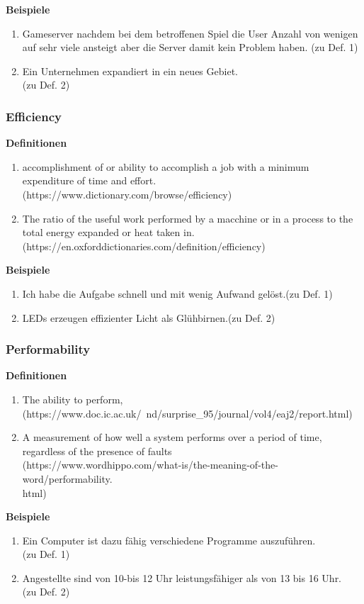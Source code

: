 \documentclass[a4paper, 15pt]{scrartcl}
\begin{document}
					\textbf{Beispiele}
					\begin{enumerate}
						\item Gameserver nachdem bei dem betroffenen Spiel die User Anzahl von wenigen auf sehr viele ansteigt aber die Server damit kein Problem haben. (zu Def. 1)
		
						\item Ein Unternehmen expandiert in ein neues Gebiet. \\(zu Def. 2)
					\end{enumerate}
	
	\newpage
				\subsubsection*{Efficiency}
					\textbf{Definitionen}
					\begin{enumerate}
						\item \grqq accomplishment of or ability to accomplish a job with a minimum expenditure of time and effort.\grqq(https://www.dictionary.com/browse/efficiency)
		
						\item \grqq The ratio of the useful work performed by a macchine or in a process to the total energy expanded or heat taken in.\grqq\\ (https://en.oxforddictionaries.com/definition/efficiency)
					\end{enumerate}
	
					\textbf{Beispiele}
					\begin{enumerate}
						\item Ich habe die Aufgabe schnell und mit wenig Aufwand gelöst.(zu Def. 1)
		
						\item LEDs erzeugen effizienter Licht als Glühbirnen.(zu Def. 2)
					\end{enumerate}
	
	
				\subsubsection*{Performability}
					\textbf{Definitionen}
					\begin{enumerate}
						\item \grqq The ability to perform,\grqq \\ (https://www.doc.ic.ac.uk/~nd/surprise\_95/journal/vol4/eaj2/report.html)
		
						\item \grqq A measurement of how well a system performs over a period of time, regardless of the presence of faults\grqq\\ (https://www.wordhippo.com/what-is/the-meaning-of-the-word/performability.\\html)
					\end{enumerate}
	
					\textbf{Beispiele}
					\begin{enumerate}
						\item Ein Computer ist dazu fähig verschiedene Programme auszuführen.\\(zu Def. 1)
		
						\item Angestellte sind von 10-bis 12 Uhr leistungsfähiger als von 13 bis 16 Uhr. \\(zu Def. 2)
					\end{enumerate}

		
\end{document}

